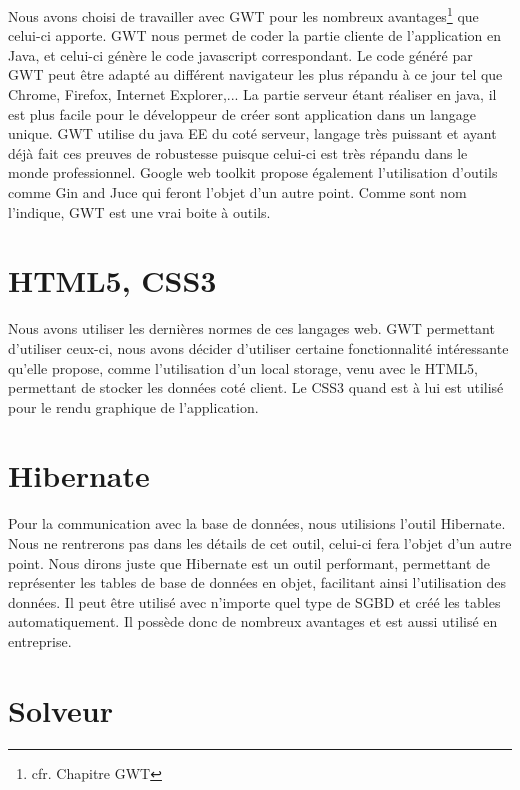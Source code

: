 Nous avons choisi de travailler avec GWT pour les nombreux avantages\footnote{cfr. Chapitre GWT} que celui-ci apporte. GWT nous permet de coder la partie cliente de l'application en Java, et celui-ci génère le code javascript correspondant. Le code généré par GWT peut être adapté au différent navigateur les plus répandu à ce jour tel que Chrome, Firefox, Internet Explorer,... La partie serveur étant réaliser en java, il est plus facile pour le développeur de créer sont application dans un langage unique. GWT utilise du java EE du coté serveur, langage très puissant et ayant déjà fait ces preuves de robustesse puisque celui-ci est très répandu dans le monde professionnel. Google web toolkit propose également l'utilisation d'outils comme Gin and Juce qui feront l'objet d'un autre point. Comme sont nom l'indique, GWT est une vrai boite à outils.


\section{HTML5, CSS3}
Nous avons utiliser les dernières normes de ces langages web. GWT permettant d'utiliser ceux-ci, nous avons décider d'utiliser certaine fonctionnalité intéressante qu'elle propose, comme l'utilisation d'un local storage, venu avec le HTML5, permettant de stocker les données coté client. Le CSS3 quand est à lui est utilisé pour le rendu graphique de l'application.

\section{Hibernate}
Pour la communication avec la base de données, nous utilisions l'outil Hibernate. Nous ne rentrerons pas dans les détails de cet outil, celui-ci fera l'objet d'un autre point. Nous dirons juste que Hibernate est un outil performant, permettant de représenter les tables de base de données en objet, facilitant ainsi l'utilisation des données. Il peut être utilisé avec n'importe quel type de SGBD et créé les tables automatiquement. Il possède donc de nombreux avantages et est aussi utilisé en entreprise.

\section{Solveur}

